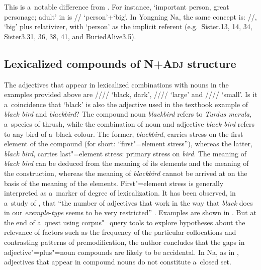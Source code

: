This is a~notable difference from . For instance, ‘important person, great personage; adult’ in
 is // ‘person’+‘big’. 
In Yongning Na, the same concept is:
//, ‘big’ plus relativizer, with ‘person’ as the implicit referent (e.g.~Sister.13, 14,
34, Sister3.31, 36, 38, 41, and BuriedAlive3.5).

\subsection{Lexicalized compounds of  \textsc{N}+\textsc{Adj} structure}
\label{sec:lexicalizedcompoundsofnadjstructure}

The adjectives that appear in lexicalized combinations with nouns in the examples provided above are
//// ‘black, dark’, //// ‘large’ and //// ‘small’. Is it a~coincidence that
‘black’ is also the adjective used in the textbook example of  \textit{black bird} and
\textit{blackbird}? The compound noun \textit{blackbird} refers to \textit{Turdus merula}, a~species
of thrush, while the combination of noun and adjective \textit{black bird} refers to any bird of
a~black colour. The former, \textit{blackbird}, carries stress on the first element of the compound
(for short: “first"=element stress”), whereas the latter, \textit{black bird}, carries last"=element
stress: primary stress on \textit{bird}. The meaning of \textit{black bird} can be deduced from the
meaning of its elements and the meaning of the construction, whereas the meaning of
\textit{blackbird} cannot be arrived at on the basis of the meaning of the elements. First"=element stress is
generally interpreted as a~marker of degree of {lexicalization}. It has been observed, in a~study of
, that “the number of adjectives that work in the way that \textit{black} does in our
\textit{exemple}-\textit{type} seems to be very restricted” \citep[9]{bauer2004}. Examples are
shown in . But at the end of a~quest using corpus"=query tools to explore hypotheses about the relevance of factors such as the frequency of the particular collocations and contrasting patterns of premodification, the author concludes that the gaps in  adjective"=plus"=noun compounds are likely to be accidental. In Na, as in , adjectives that appear in compound nouns do not constitute a~closed set.


